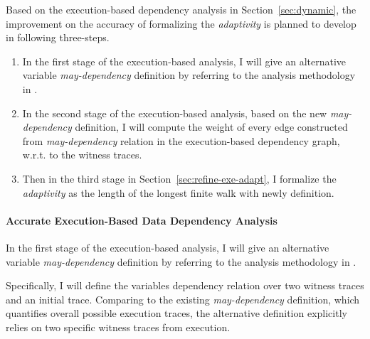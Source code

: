 Based on the execution-based dependency analysis in Section~\ref{sec:dynamic}, the improvement on the accuracy 
of formalizing the
\emph{adaptivity} is planned to develop in following three-steps.
\begin{enumerate}
\item In the first stage of the execution-based analysis, 
I will give an alternative variable \emph{may-dependency} definition 
by referring to the analysis methodology in \cite{Cousot19a}.
%
%
\item In the second stage of the execution-based analysis, 
based on the new \emph{may-dependency} definition,
I will compute the weight of every edge constructed from 
\emph{may-dependency} relation in the execution-based dependency graph, w.r.t. to the witness traces.
%
\item Then in the third stage in Section~\ref{sec:refine-exe-adapt}, 
I formalize the \emph{adaptivity} as the 
length of the longest finite walk with newly definition. 
\end{enumerate}

\paragraph{Accurate Execution-Based Data Dependency Analysis}
\label{sec:refine-exe-datadep}
In the first stage of the execution-based analysis, 
I will give an alternative variable \emph{may-dependency} definition 
by referring to the analysis methodology in \cite{Cousot19a}.

Specifically, I will define the variables dependency relation over two witness traces and an initial trace. Comparing to 
the existing \emph{may-dependency} definition, which quantifies overall possible execution traces, the alternative
definition explicitly relies on two specific witness traces from execution.

